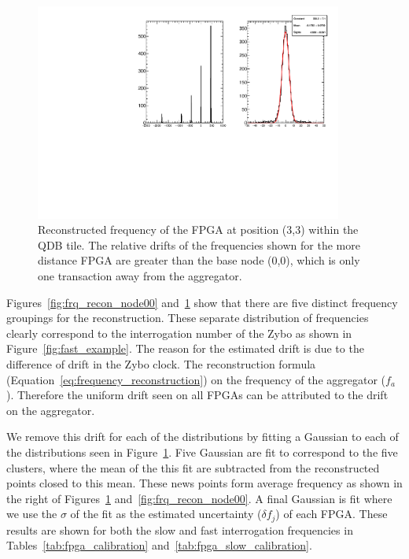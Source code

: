 \begin{figure}[]
\centering
\includegraphics[width=0.9\textwidth]{images/(3,3).pdf}
\caption{Reconstructed frequency of the FPGA at position (3,3) within the QDB tile.
The relative drifts of the frequencies shown for the more distance FPGA are greater than the base node (0,0), which is only one transaction away from the aggregator.
}
\label{fig:frq_recon_node33}
\end{figure}


Figures~\ref{fig:frq_recon_node00} and~\ref{fig:frq_recon_node33} show that there are five distinct frequency groupings for the reconstruction.
These separate distribution of frequencies clearly correspond to the interrogation number of the Zybo as shown in Figure~\ref{fig:fast_example}.
The reason for the estimated drift is due to the difference of drift in the Zybo clock.
The reconstruction formula (Equation~\ref{eq:frequency_reconstruction}) on the frequency of the aggregator ($f_{a}$).
Therefore the uniform drift seen on all FPGAs can be attributed to the drift on the aggregator.

We remove this drift for each of the distributions by fitting a Gaussian to each of the distributions seen in Figure~\ref{fig:frq_recon_node33}.
Five Gaussian are fit to correspond to the five clusters, where the mean of the this fit are subtracted from the reconstructed points closed to this mean.
These news points form average frequency as shown in the right of Figures~\ref{fig:frq_recon_node33} and~\ref{fig:frq_recon_node00}.
A final Gaussian is fit where we use the $\sigma$ of the fit as the estimated uncertainty ($\delta f_{j}$) of each FPGA.
These results are shown for both the slow and fast interrogation frequencies in Tables~\ref{tab:fpga_calibration} and~\ref{tab:fpga_slow_calibration}.


